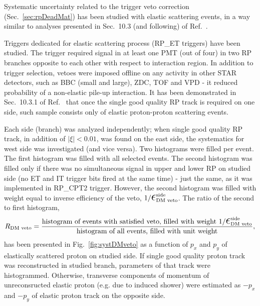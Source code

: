 Systematic uncertainty related to the trigger veto correction (Sec.~\ref{sec:rpDeadMat}) has been studied with elastic scattering events, in a way similar to analyses presented in Sec.~10.3 (and following) of Ref.~\cite{supplementaryNote}. 

Triggers dedicated for elastic scattering process (RP\_ET triggers) have been studied. The trigger required signal in at least one PMT (out of four) in two RP branches opposite to each other with respect to interaction region. In addition to trigger selection, vetoes were imposed offline on any activity in other STAR detectors, such as BBC (small and large), ZDC, TOF and VPD - it reduced probability of a non-elastic pile-up interaction. It has been demonstrated in Sec.~10.3.1 of Ref.~\cite{supplementaryNote} that once the single good quality RP track is required on one side, such sample consists only of elastic proton-proton scattering events.

Each side (branch) was analyzed independently; when single good quality RP track, in addition of $|\xi|<0.01$, was found on the east side, the systematics for west side was investigated (and vice versa). Two histograms were filled per event. The first histogram was filled with all selected events. The second histogram was filled only if there was no simultaneous signal in upper and lower RP on studied side (no ET and IT trigger bits fired at the same time) - just the same, as it was implemented in RP\_CPT2 trigger. However, the second histogram was filled with weight equal to inverse efficiency of the veto, $1/\mbox{\LARGE$\epsilon$}_{\text{DM~veto}}^{\text{side}}$. The ratio of the second to first histogram,
\begin{equation}
 R_{\text{DM~veto}} = \frac{\text{histogram of events with satisfied veto, filled with weight } 1/\mbox{\LARGE$\epsilon$}_{\text{DM~veto}}^{\text{side}}}{\text{histogram of all events, filled with unit weight}},
\end{equation}
has been presented in Fig.~\ref{fig:systDMveto} as a function of $p_{x}$ and $p_{y}$ of elastically scattered proton on studied side. If single good quality proton track was reconstructed in studied branch, parameters of that track were histogrammed. Otherwise, transverse components of momentum of unreconsructed elastic proton (e.g. due to induced shower) were estimated as $-p_{x}$ and $-p_{y}$ of elastic proton track on the opposite side.


